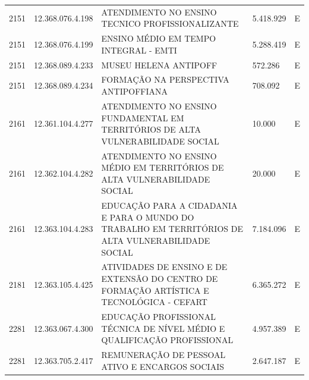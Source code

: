 \documentclass{article}
\begin{document}
\begin{longtable}[c]{m{1cm}|m{2cm}|m{10cm}|m{2cm}|m{1cm}}
\multicolumn{1}{C{1cm}|}{2151} & \multicolumn{1}{C{2cm}|}{12.368.076.4.198} & \multicolumn{1}{L{10cm}|}{ATENDIMENTO NO ENSINO TECNICO PROFISSIONALIZANTE} & \multicolumn{1}{R{2cm}|}{5.418.929} & \multicolumn{1}{C{1cm}}{E} \\
\multicolumn{1}{C{1cm}|}{2151} & \multicolumn{1}{C{2cm}|}{12.368.076.4.199} & \multicolumn{1}{L{10cm}|}{ENSINO MÉDIO EM TEMPO INTEGRAL - EMTI} & \multicolumn{1}{R{2cm}|}{5.288.419} & \multicolumn{1}{C{1cm}}{E} \\
\multicolumn{1}{C{1cm}|}{2151} & \multicolumn{1}{C{2cm}|}{12.368.089.4.233} & \multicolumn{1}{L{10cm}|}{MUSEU HELENA ANTIPOFF} & \multicolumn{1}{R{2cm}|}{572.286} & \multicolumn{1}{C{1cm}}{E} \\
\multicolumn{1}{C{1cm}|}{2151} & \multicolumn{1}{C{2cm}|}{12.368.089.4.234} & \multicolumn{1}{L{10cm}|}{FORMAÇÃO NA PERSPECTIVA ANTIPOFFIANA} & \multicolumn{1}{R{2cm}|}{708.092} & \multicolumn{1}{C{1cm}}{E} \\
\multicolumn{1}{C{1cm}|}{2161} & \multicolumn{1}{C{2cm}|}{12.361.104.4.277} & \multicolumn{1}{L{10cm}|}{ATENDIMENTO NO ENSINO FUNDAMENTAL EM TERRITÓRIOS DE ALTA VULNERABILIDADE SOCIAL} & \multicolumn{1}{R{2cm}|}{10.000} & \multicolumn{1}{C{1cm}}{E} \\
\multicolumn{1}{C{1cm}|}{2161} & \multicolumn{1}{C{2cm}|}{12.362.104.4.282} & \multicolumn{1}{L{10cm}|}{ATENDIMENTO NO ENSINO MÉDIO EM TERRITÓRIOS DE ALTA VULNERABILIDADE SOCIAL} & \multicolumn{1}{R{2cm}|}{20.000} & \multicolumn{1}{C{1cm}}{E} \\
\multicolumn{1}{C{1cm}|}{2161} & \multicolumn{1}{C{2cm}|}{12.363.104.4.283} & \multicolumn{1}{L{10cm}|}{EDUCAÇÃO PARA A CIDADANIA E PARA O MUNDO DO TRABALHO EM TERRITÓRIOS DE ALTA VULNERABILIDADE SOCIAL} & \multicolumn{1}{R{2cm}|}{7.184.096} & \multicolumn{1}{C{1cm}}{E} \\
\multicolumn{1}{C{1cm}|}{2181} & \multicolumn{1}{C{2cm}|}{12.363.105.4.425} & \multicolumn{1}{L{10cm}|}{ATIVIDADES DE ENSINO E DE EXTENSÃO DO CENTRO DE FORMAÇÃO ARTÍSTICA E TECNOLÓGICA - CEFART} & \multicolumn{1}{R{2cm}|}{6.365.272} & \multicolumn{1}{C{1cm}}{E} \\
\multicolumn{1}{C{1cm}|}{2281} & \multicolumn{1}{C{2cm}|}{12.363.067.4.300} & \multicolumn{1}{L{10cm}|}{EDUCAÇÃO PROFISSIONAL TÉCNICA DE NÍVEL MÉDIO E QUALIFICAÇÃO PROFISSIONAL} & \multicolumn{1}{R{2cm}|}{4.957.389} & \multicolumn{1}{C{1cm}}{E} \\
\multicolumn{1}{C{1cm}|}{2281} & \multicolumn{1}{C{2cm}|}{12.363.705.2.417} & \multicolumn{1}{L{10cm}|}{REMUNERAÇÃO DE PESSOAL ATIVO E ENCARGOS SOCIAIS} & \multicolumn{1}{R{2cm}|}{2.647.187} & \multicolumn{1}{C{1cm}}{E} \\

\end{longtable}
\end{document}
